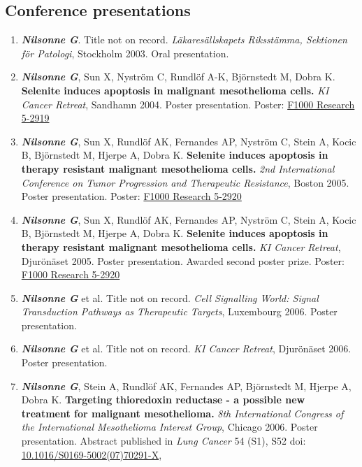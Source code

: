 \documentclass[10pt]{article}
\begin{document}
\subsection*{Conference presentations}
\begin{enumerate}[nolistsep]
\item \textbf{\textit{Nilsonne G}}. Title not on record. \emph{Läkaresällskapets Riksstämma, Sektionen för Patologi}, Stockholm 2003. Oral presentation.
\item \textbf{\textit{Nilsonne G}}, Sun X, Nyström C, Rundlöf A-K, Björnstedt M, Dobra K. \textbf{Selenite induces apoptosis in malignant mesothelioma cells.} \emph{KI Cancer Retreat}, Sandhamn 2004. Poster presentation.
Poster: \href{http://dx.doi.org/10.7490/f1000research.1113571.1}{F1000 Research 5-2919}  
\item \textbf{\textit{Nilsonne G}}, Sun X, Rundlöf AK, Fernandes AP, Nyström C, Stein A, Kocic B, Björnstedt M, Hjerpe A, Dobra K. \textbf{Selenite induces apoptosis in therapy resistant malignant mesothelioma cells.} \emph{2nd International Conference on Tumor Progression and Therapeutic Resistance}, Boston 2005. Poster presentation.
Poster: \href{http://dx.doi.org/10.7490/f1000research.1113572.1}{F1000 Research 5-2920}    
\item \textbf{\textit{Nilsonne G}}, Sun X, Rundlöf AK, Fernandes AP, Nyström C, Stein A, Kocic B, Björnstedt M, Hjerpe A, Dobra K. \textbf{Selenite induces apoptosis in therapy resistant malignant mesothelioma cells.} \emph{KI Cancer Retreat}, Djurönäset 2005. Poster presentation. Awarded second poster prize.
Poster: \href{http://dx.doi.org/10.7490/f1000research.1113572.1}{F1000 Research 5-2920}    
\item \textbf{\textit{Nilsonne G}} et al. Title not on record. \emph{Cell Signalling World: Signal Transduction Pathways as Therapeutic Targets}, Luxembourg 2006. Poster presentation.
\item \textbf{\textit{Nilsonne G}} et al. Title not on record. \emph{KI Cancer Retreat}, Djurönäset 2006. Poster presentation.
\item \textbf{\textit{Nilsonne G}}, Stein A, Rundlöf AK, Fernandes AP, Björnstedt M, Hjerpe A, Dobra K. \textbf{Targeting thioredoxin reductase - a possible new treatment for malignant mesothelioma.} \emph{8th International Congress of the International Mesothelioma Interest Group}, Chicago 2006. Poster presentation. Abstract published in \emph{Lung Cancer} 54 (S1), S52
doi: \href{http://dx.doi.org/10.1016/S0169-5002(07)70291-X}{10.1016/S0169-5002(07)70291-X}, 

\end{enumerate}
\end{document}

